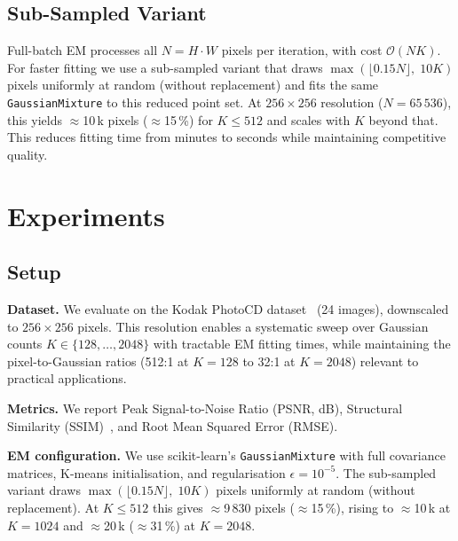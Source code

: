 \documentclass[a4paper,conference]{IEEEtran}
\begin{document}
\subsection{Sub-Sampled Variant}
\label{subsec:minibatch_method}

Full-batch EM processes all $N\!=\!H\!\cdot\!W$ pixels per iteration, with cost
$\mathcal{O}(NK)$.
For faster fitting we use a sub-sampled variant that draws
$\max(\lfloor 0.15N \rfloor,\; 10K)$ pixels uniformly at random
(without replacement) and fits the same \texttt{GaussianMixture}
to this reduced point set.
At $256\!\times\!256$ resolution ($N\!=\!65\,536$), this yields
$\approx$10\,k pixels ($\approx$15\,\%) for $K\!\leq\!512$ and
scales with $K$ beyond that.
This reduces fitting time from minutes to seconds while maintaining
competitive quality.


\section{Experiments}
\label{sec:experiments}

\subsection{Setup}
\label{subsec:setup}

\textbf{Dataset.}
We evaluate on the Kodak PhotoCD dataset~\cite{kodak} (24 images),
downscaled to $256\!\times\!256$ pixels.
This resolution enables a systematic sweep over Gaussian counts
$K\!\in\!\{128,\ldots,2048\}$ with tractable EM fitting times,
while maintaining the pixel-to-Gaussian ratios (512:1 at $K\!=\!128$
to 32:1 at $K\!=\!2048$) relevant to practical applications.

\textbf{Metrics.}
We report Peak Signal-to-Noise Ratio (PSNR, dB), Structural Similarity
(SSIM)~\cite{wang2004ssim}, and Root Mean Squared Error (RMSE).

\textbf{EM configuration.}
We use scikit-learn's \texttt{GaussianMixture} with full covariance
matrices, K-means initialisation, and regularisation
$\epsilon\!=\!10^{-5}$.
The sub-sampled variant draws $\max(\lfloor 0.15N \rfloor,\; 10K)$
pixels uniformly at random (without replacement).
At $K\!\leq\!512$ this gives $\approx$9\,830 pixels ($\approx$15\,\%),
rising to $\approx$10\,k at $K\!=\!1024$ and $\approx$20\,k
($\approx$31\,\%) at $K\!=\!2048$.
\end{document}
